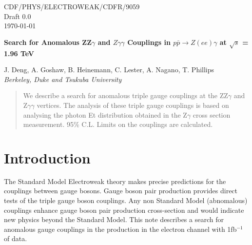 \documentclass[12pt,twoside,letterpaper]{article}
\begin{document}
\thispagestyle{empty}
\vspace*{-3.5cm}
\begin{flushright}
CDF/PHYS/ELECTROWEAK/CDFR/9059\\
Draft 0.0\\
\today
\end{flushright}

\vspace{0.5in}
\begin{center}
  \begin{Large}
  {\bf Search for Anomalous ZZ$\gamma$ and $Z\gamma\gamma$ Couplings
  in $p\bar{p} \rightarrow Z(ee)\gamma$ at $\sqrt{s}$ = 1.96 TeV}
  \end{Large}
\end{center}

\vspace{0.5in}

\begin{center}
\small{J. Deng, A. Goshaw, B. Heinemann, C. Lester, A. Nagano, T. Phillips}\vspace{1.0ex} \\
\emph{Berkeley, Duke and Tsukuba University}
\end{center}

\begin{abstract}
We describe a search for anomalous triple gauge couplings at the
ZZ$\gamma$ and Z$\gamma\gamma$ vertices. The analysis of these triple gauge couplings is based on
analysing the photon Et distribution 
obtained in the Z$\gamma$ cross section measurement. 
95\% C.L. Limits on the couplings are calculated. 

\end{abstract}


\section{Introduction} 
The Standard Model Electroweak theory makes precise predictions for the couplings between gauge bosons. Gauge boson pair production provides direct tests of the triple gauge boson couplings. Any non Standard Model (abnomalous) couplings enhance gauge boson pair production cross-section and would indicate new physics beyond the Standard Model. This note describes a search for anomalous gauge couplings in the \Zg production in the electron channel with 1fb$^{-1}$ of data.
\end{document}
